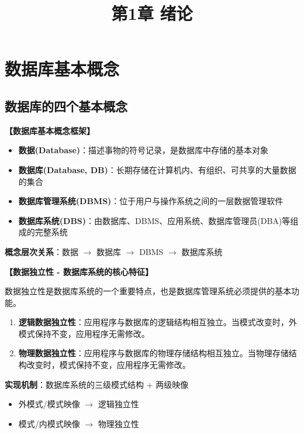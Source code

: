 \documentclass[12pt, a4paper]{article}
\title{\textbf{第1章 绪论}}
\date{}
\newenvironment{bluebox}[1]{%
  \begin{trivlist}
  \item[\hskip\labelsep \textbf{#1}]
  \setlength{\parskip}{0.5ex}
  \setlength{\itemsep}{0.5ex}
}{%
  \end{trivlist}
}
\begin{document}
\maketitle
\thispagestyle{empty}
\newpage

\section{数据库基本概念}

\subsection{数据库的四个基本概念}

\begin{bluebox}{核心概念框架}
	\textbf{【数据库基本概念框架】}

	\begin{itemize}[leftmargin=*, nosep]
		\item \textbf{数据(Database)}：描述事物的符号记录，是数据库中存储的基本对象
		\item \textbf{数据库(Database, DB)}：长期存储在计算机内、有组织、可共享的大量数据的集合
		\item \textbf{数据库管理系统(DBMS)}：位于用户与操作系统之间的一层数据管理软件
		\item \textbf{数据库系统(DBS)}：由数据库、DBMS、应用系统、数据库管理员(DBA)等组成的完整系统
	\end{itemize}

	\textbf{概念层次关系}：数据 $\rightarrow$ 数据库 $\rightarrow$ DBMS $\rightarrow$ 数据库系统
\end{bluebox}

\begin{bluebox}{数据独立性}
	\textbf{【数据独立性 - 数据库系统的核心特征】}

	数据独立性是数据库系统的一个重要特点，也是数据库管理系统必须提供的基本功能。

	\begin{enumerate}[leftmargin=*, label=\textbf{\arabic*.}]
		\item \textbf{逻辑数据独立性}：应用程序与数据库的逻辑结构相互独立。当模式改变时，外模式保持不变，应用程序无需修改。
		\item \textbf{物理数据独立性}：应用程序与数据库的物理存储结构相互独立。当物理存储结构改变时，模式保持不变，应用程序无需修改。
	\end{enumerate}

	\textbf{实现机制}：数据库系统的三级模式结构 + 两级映像

	\begin{itemize}
		\item 外模式/模式映像 $\rightarrow$ 逻辑独立性
		\item 模式/内模式映像 $\rightarrow$ 物理独立性
	\end{itemize}
\end{bluebox}
\end{document}

